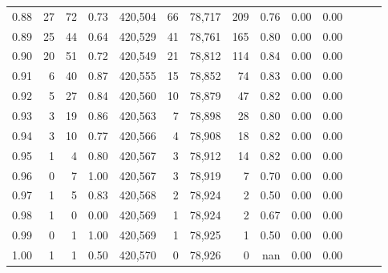 \begin{tabular}{rrrrrrrrrrrrrr}
0.88 &      27 &     72 &  0.73 &  420,504 &       66 &  78,717 &     209 &  0.76 &  0.00 &      0.00 \\
0.89 &      25 &     44 &  0.64 &  420,529 &       41 &  78,761 &     165 &  0.80 &  0.00 &      0.00 \\
0.90 &      20 &     51 &  0.72 &  420,549 &       21 &  78,812 &     114 &  0.84 &  0.00 &      0.00 \\
0.91 &       6 &     40 &  0.87 &  420,555 &       15 &  78,852 &      74 &  0.83 &  0.00 &      0.00 \\
0.92 &       5 &     27 &  0.84 &  420,560 &       10 &  78,879 &      47 &  0.82 &  0.00 &      0.00 \\
0.93 &       3 &     19 &  0.86 &  420,563 &        7 &  78,898 &      28 &  0.80 &  0.00 &      0.00 \\
0.94 &       3 &     10 &  0.77 &  420,566 &        4 &  78,908 &      18 &  0.82 &  0.00 &      0.00 \\
0.95 &       1 &      4 &  0.80 &  420,567 &        3 &  78,912 &      14 &  0.82 &  0.00 &      0.00 \\
0.96 &       0 &      7 &  1.00 &  420,567 &        3 &  78,919 &       7 &  0.70 &  0.00 &      0.00 \\
0.97 &       1 &      5 &  0.83 &  420,568 &        2 &  78,924 &       2 &  0.50 &  0.00 &      0.00 \\
0.98 &       1 &      0 &  0.00 &  420,569 &        1 &  78,924 &       2 &  0.67 &  0.00 &      0.00 \\
0.99 &       0 &      1 &  1.00 &  420,569 &        1 &  78,925 &       1 &  0.50 &  0.00 &      0.00 \\
1.00 &       1 &      1 &  0.50 &  420,570 &        0 &  78,926 &       0 &   nan &  0.00 &      0.00 \\
\bottomrule
\end{tabular}
